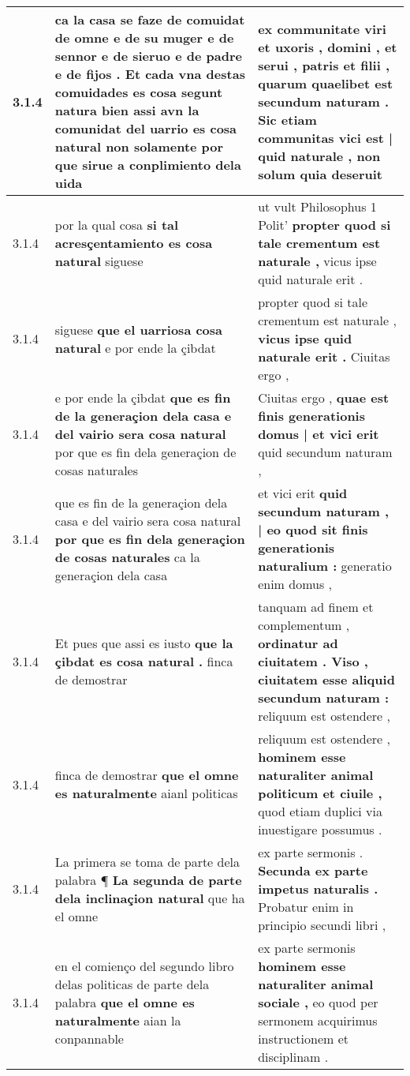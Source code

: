 \begin{tabular}{|p{1cm}|p{6.5cm}|p{6.5cm}|}
3.1.4 & ca la casa se faze de comuidat de omne e de su muger e de sennor e de sieruo e de padre e de fijos . Et cada vna destas comuidades es cosa segunt natura bien \textbf{ assi avn la comunidat del uarrio es cosa natural } non solamente por que sirue a conplimiento dela uida & ex communitate viri et uxoris , domini , et serui , patris et filii , quarum quaelibet est secundum naturam . \textbf{ Sic etiam communitas vici est | quid naturale , } non solum quia deseruit \\\hline
3.1.4 & por la qual cosa \textbf{ si tal acresçentamiento es cosa natural } siguese & ut vult Philosophus 1 Polit’ \textbf{ propter quod si tale crementum est naturale , } vicus ipse quid naturale erit . \\\hline
3.1.4 & siguese \textbf{ que el uarriosa cosa natural } e por ende la çibdat & propter quod si tale crementum est naturale , \textbf{ vicus ipse quid naturale erit . } Ciuitas ergo , \\\hline
3.1.4 & e por ende la çibdat \textbf{ que es fin de la generaçion dela casa e del vairio sera cosa natural } por que es fin dela generaçion de cosas naturales & Ciuitas ergo , \textbf{ quae est finis generationis domus | et vici erit } quid secundum naturam , \\\hline
3.1.4 & que es fin de la generaçion dela casa e del vairio sera cosa natural \textbf{ por que es fin dela generaçion de cosas naturales } ca la generaçion dela casa & et vici erit \textbf{ quid secundum naturam , | eo quod sit finis generationis naturalium : } generatio enim domus , \\\hline
3.1.4 & Et pues que assi es iusto \textbf{ que la çibdat es cosa natural . } finca de demostrar & tanquam ad finem et complementum , \textbf{ ordinatur ad ciuitatem . Viso , ciuitatem esse aliquid secundum naturam : } reliquum est ostendere , \\\hline
3.1.4 & finca de demostrar \textbf{ que el omne es naturalmente } aianl politicas & reliquum est ostendere , \textbf{ hominem esse naturaliter animal politicum et ciuile , } quod etiam duplici via inuestigare possumus . \\\hline
3.1.4 & La primera se toma de parte dela palabra ¶ \textbf{ La segunda de parte dela inclinaçion natural } que ha el omne & ex parte sermonis . \textbf{ Secunda ex parte impetus naturalis . } Probatur enim in principio secundi libri , \\\hline
3.1.4 & en el comienço del segundo libro delas politicas de parte dela palabra \textbf{ que el omne es naturalmente } aian la conpannable & ex parte sermonis \textbf{ hominem esse naturaliter animal sociale , } eo quod per sermonem acquirimus instructionem et disciplinam . \\\hline

\end{tabular}
